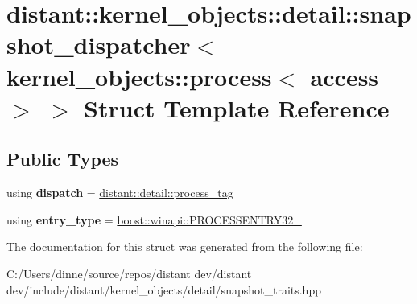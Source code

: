 \hypertarget{structdistant_1_1kernel__objects_1_1detail_1_1snapshot__dispatcher_3_01kernel__objects_1_1process_3_01access_01_4_01_4}{}\section{distant\+:\+:kernel\+\_\+objects\+:\+:detail\+:\+:snapshot\+\_\+dispatcher$<$ kernel\+\_\+objects\+:\+:process$<$ access $>$ $>$ Struct Template Reference}
\label{structdistant_1_1kernel__objects_1_1detail_1_1snapshot__dispatcher_3_01kernel__objects_1_1process_3_01access_01_4_01_4}
\subsection*{Public Types}
\begin{DoxyCompactItemize}
\item 
\mbox{\label{structdistant_1_1kernel__objects_1_1detail_1_1snapshot__dispatcher_3_01kernel__objects_1_1process_3_01access_01_4_01_4_ac5366d8b356f0022d5035817149c355a}} 
using {\bfseries dispatch} = \mbox{\hyperlink{classdistant_1_1detail_1_1process__tag}{distant\+::detail\+::process\+\_\+tag}}
\item 
\mbox{\label{structdistant_1_1kernel__objects_1_1detail_1_1snapshot__dispatcher_3_01kernel__objects_1_1process_3_01access_01_4_01_4_a64f7138cf29ff85be19dab0eb6603789}} 
using {\bfseries entry\+\_\+type} = \mbox{\hyperlink{structboost_1_1winapi_1_1tag_p_r_o_c_e_s_s_e_n_t_r_y32__}{boost\+::winapi\+::\+P\+R\+O\+C\+E\+S\+S\+E\+N\+T\+R\+Y32\+\_\+}}
\end{DoxyCompactItemize}


The documentation for this struct was generated from the following file\+:\begin{DoxyCompactItemize}
\item 
C\+:/\+Users/dinne/source/repos/distant dev/distant dev/include/distant/kernel\+\_\+objects/detail/snapshot\+\_\+traits.\+hpp\end{DoxyCompactItemize}
